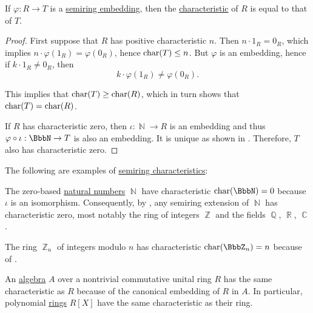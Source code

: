 \begin{proposition}\label{thm:semiring_embedding_preserves_characterstic}
  If \( \varphi: R \to T \) is a \hyperref[def:semiring/homomorphism]{semiring embedding}, then the \hyperref[def:semiring_characteristic]{characteristic} of \( R \) is equal to that of \( T \).
\end{proposition}
\begin{proof}
  First suppose that \( R \) has positive characteristic \( n \). Then \( n \cdot 1_R = 0_R \), which implies \( n \cdot \varphi(1_R) = \varphi(0_R) \), hence \( \operatorname{char}(T) \leq n \). But \( \varphi \) is an embedding, hence if \( k \cdot 1_R \neq 0_R \), then
  \begin{equation*}
    k \cdot \varphi(1_R) \neq \varphi(0_R).
  \end{equation*}

  This implies that \( \operatorname{char}(T) \geq \operatorname{char}(R) \), which in turn shows that \( \operatorname{char}(T) = \operatorname{char}(R) \).

  If \( R \) has characteristic zero, then \( \iota: \BbbN \to R \) is an embedding and thus \( \varphi \bincirc \iota: \BbbN \to T \) is also an embedding. It is unique as shown in . Therefore, \( T \) also has characteristic zero.
\end{proof}

\begin{example}\label{ex:semiring_characteristic}
  The following are examples of \hyperref[def:semiring_characteristic]{semiring characteristics}:

  \begin{thmenum}
     The zero-based \hyperref[def:set_of_natural_numbers]{natural numbers} \( \BbbN \) have characteristic \( \op{char}(\BbbN) = 0 \) because \( \iota \) is an isomorphism. Consequently, by , any semiring extension of \( \BbbN \) has characteristic zero, most notably the ring of integers \( \BbbZ \) and the fields \( \BbbQ \), \( \BbbR \), \( \BbbC \).

     The ring \hyperref[thm:ring_of_integers_modulo]{\( \BbbZ_n \)} of integers modulo \( n \) has characteristic \( \op{char}(\BbbZ_n) = n \) because of .

     An \hyperref[def:algebra_over_semiring]{algebra} \( A \) over a nontrivial commutative unital ring \( R \) has the same characteristic as \( R \) because of the canonical embedding of \( R \) in \( A \). In particular, polynomial \hyperref[def:algebra_of_polynomials]{rings} \( R[X] \) have the same characteristic as their ring.
  \end{thmenum}
\end{example}

